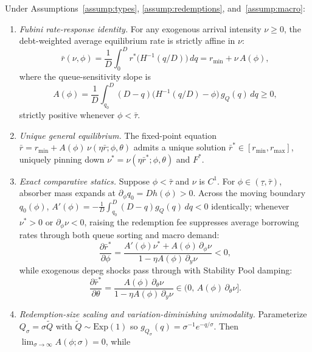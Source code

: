 \begin{theorem}\label{thm:ge}
Under Assumptions~\ref{assump:types}, \ref{assump:redemptions}, and~\ref{assump:macro}:
\begin{enumerate}[label=(\roman*), leftmargin=2.2em, itemsep=2pt]
\item \emph{Fubini rate-response identity.} For any exogenous arrival intensity $\nu \ge 0$, the debt-weighted average equilibrium rate is strictly affine in $\nu$:
\begin{equation}\label{eq:rbar_affine}
\bar{r}(\nu, \phi) = \frac{1}{D}\int_0^D r^*\!\bigl(H^{-1}(q/D)\bigr)\,dq = r_{\min} + \nu\,A(\phi),
\end{equation}
where the queue-sensitivity slope is
\begin{equation}\label{eq:A_phi}
A(\phi) = \frac{1}{D}\int_{q_0}^{D} (D - q)\bigl(H^{-1}(q/D) - \phi\bigr)\,g_Q(q)\,dq \ge 0,
\end{equation}
strictly positive whenever $\phi < \bar{\tau}$.
\item \emph{Unique general equilibrium.} The fixed-point equation $\bar{r} = r_{\min} + A(\phi)\,\nu(\eta \bar{r}; \phi, \theta)$ admits a unique solution $\bar{r}^* \in [r_{\min}, r_{\max}]$, uniquely pinning down $\nu^* = \nu(\eta \bar{r}^*; \phi, \theta)$ and $F^*$.
\item \emph{Exact comparative statics.} Suppose $\phi < \bar{\tau}$ and $\nu$ is $C^1$. For $\phi \in (\underline{\tau}, \bar{\tau})$, absorber mass expands at $\partial_\phi q_0 = D h(\phi) > 0$. Across the moving boundary $q_0(\phi)$, $A'(\phi) = -\frac{1}{D}\int_{q_0}^D (D - q) g_Q(q)\,dq < 0$ identically; whenever $\nu^* > 0$ or $\partial_\phi \nu < 0$, raising the redemption fee suppresses average borrowing rates through both queue sorting and macro demand:
\begin{equation}\label{eq:cs_phi}
\frac{\partial \bar{r}^*}{\partial \phi} = \frac{A'(\phi)\nu^* + A(\phi)\,\partial_\phi \nu}{1 - \eta A(\phi)\,\partial_y \nu} < 0,
\end{equation}
while exogenous depeg shocks pass through with Stability Pool damping:
\begin{equation}\label{eq:cs_theta}
\frac{\partial \bar{r}^*}{\partial \theta} = \frac{A(\phi)\,\partial_\theta \nu}{1 - \eta A(\phi)\,\partial_y \nu} \in \bigl(0,\, A(\phi)\,\partial_\theta \nu\bigr].
\end{equation}
\item \emph{Redemption-size scaling and variation-diminishing unimodality.} Parameterize $Q_\sigma = \sigma \tilde{Q}$ with $\tilde{Q} \sim \mathrm{Exp}(1)$ so $g_{Q_\sigma}(q) = \sigma^{-1} e^{-q/\sigma}$. Then $\lim_{\sigma \to \infty} A(\phi; \sigma) = 0$, while

\end{enumerate}
\end{theorem}
